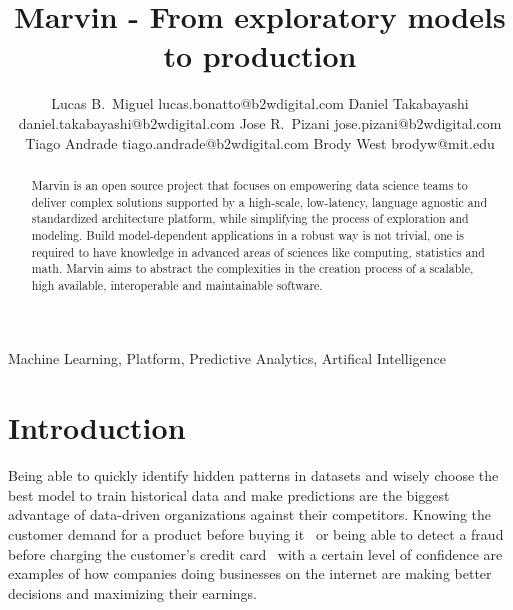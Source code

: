 \documentclass[twoside,11pt]{article}
\begin{document}
\title{Marvin - From exploratory models to production}

\author{\name Lucas B.\ Miguel \email lucas.bonatto@b2wdigital.com
       \AND
        \name Daniel Takabayashi \email daniel.takabayashi@b2wdigital.com
       \AND
       \name Jose R.\ Pizani \email jose.pizani@b2wdigital.com
       \AND
       \name Tiago Andrade \email tiago.andrade@b2wdigital.com
       \AND
       \name Brody West \email brodyw@mit.edu \\
       }


\maketitle

\begin{abstract}%
Marvin is an open source project that focuses on empowering data science teams to deliver complex solutions supported by a high-scale, low-latency, language agnostic and standardized architecture platform, while simplifying the process of exploration and modeling. Build model-dependent applications in a robust way is not trivial, one is required to have knowledge in advanced areas of sciences like computing, statistics and math. Marvin aims to abstract the complexities in the creation process of a scalable, high available, interoperable and maintainable software.
\end{abstract}

\begin{keywords}
  Machine Learning, Platform, Predictive Analytics, Artifical Intelligence
\end{keywords}

\section{Introduction}

Being able to quickly identify hidden patterns in datasets and wisely choose the best model to train historical data and make predictions are the biggest advantage of data-driven organizations against their competitors. Knowing the customer demand for a product before buying it~\citep{chen2000quantifying} or being able to detect a fraud before charging the customer's credit card~\citep{chan1998toward} with a certain level of confidence are examples of how companies doing businesses on the internet are making better decisions and maximizing their earnings.
\end{document}
